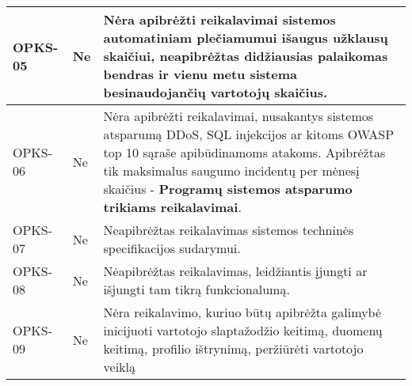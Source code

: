 \documentclass{VUMIFPSkursinis}
\begin{document}
\begin{center}
\begin{longtable}{|C{2cm}|L{2.5cm}|L{10cm}|}
		OPKS-05                                         &
		Ne                                              &
		Nėra apibrėžti reikalavimai sistemos automatiniam plečiamumui išaugus užklausų skaičiui, neapibrėžtas didžiausias palaikomas bendras ir vienu metu sistema besinaudojančių vartotojų skaičius.                                                                     \\ \hline
		OPKS-06                                         &
		Ne                                              &
		Nėra apibrėžti reikalavimai, nusakantys sistemos atsparumą DDoS, SQL injekcijos ar kitoms OWASP top 10 sąraše apibūdinamoms atakoms. Apibrėžtas tik maksimalus saugumo incidentų per mėnesį skaičius - \textbf{Programų sistemos atsparumo trikiams reikalavimai}. \\ \hline
		OPKS-07                                         &
		Ne                                              &
		Neapibrėžtas reikalavimas sistemos techninės specifikacijos sudarymui.  \\ \hline
		OPKS-08                                         &
		Ne                                              &
		Nėapibrėžtas reikalavimas, leidžiantis įjungti ar išjungti tam tikrą funkcionalumą.  \\ \hline
		OPKS-09                                         &
		Ne                                              &
		Nėra reikalavimo, kuriuo būtų apibrėžta galimybė inicijuoti vartotojo slaptažodžio keitimą, duomenų keitimą, profilio ištrynimą, peržiūrėti vartotojo veiklą \\ \hline
	\end{longtable}
\end{center}
\end{document}
